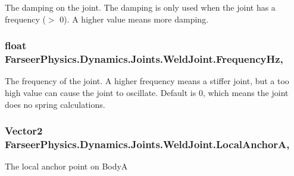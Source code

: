 The damping on the joint. The damping is only used when the joint has a frequency ($>$ 0). A higher value means more damping. 

\hypertarget{class_farseer_physics_1_1_dynamics_1_1_joints_1_1_weld_joint_ae9865abaa5f0d5578dfa0be8f9f00b09}{
\subsubsection[{Frequency\+Hz}]{\setlength{\rightskip}{0pt plus 5cm}float Farseer\+Physics.\+Dynamics.\+Joints.\+Weld\+Joint.\+Frequency\+Hz\hspace{0.3cm}{\ttfamily [get]}, {\ttfamily [set]}}}\label{class_farseer_physics_1_1_dynamics_1_1_joints_1_1_weld_joint_ae9865abaa5f0d5578dfa0be8f9f00b09}


The frequency of the joint. A higher frequency means a stiffer joint, but a too high value can cause the joint to oscillate. Default is 0, which means the joint does no spring calculations. 

\hypertarget{class_farseer_physics_1_1_dynamics_1_1_joints_1_1_weld_joint_ae3d75d438fe741faee232734de8fa855}{
\subsubsection[{Local\+Anchor\+A}]{\setlength{\rightskip}{0pt plus 5cm}Vector2 Farseer\+Physics.\+Dynamics.\+Joints.\+Weld\+Joint.\+Local\+Anchor\+A\hspace{0.3cm}{\ttfamily [get]}, {\ttfamily [set]}}}\label{class_farseer_physics_1_1_dynamics_1_1_joints_1_1_weld_joint_ae3d75d438fe741faee232734de8fa855}


The local anchor point on Body\+A 

